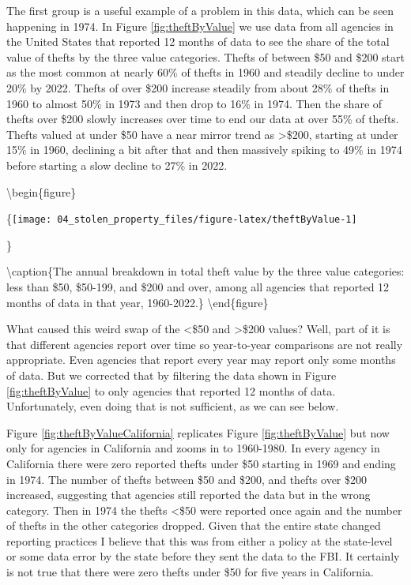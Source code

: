 \documentclass[
]{krantz}
\begin{document}
The first group is a useful example of a problem in this
data, which can be seen happening in 1974. In Figure
\ref{fig:theftByValue} we use data from all agencies in the
United States that reported 12 months of data to see the
share of the total value of thefts by the three value
categories. Thefts of between \$50 and \$200 start as the
most common at nearly 60\% of thefts in 1960 and steadily
decline to under 20\% by 2022. Thefts of over \$200 increase
steadily from about 28\% of thefts in 1960 to almost 50\% in
1973 and then drop to 16\% in 1974. Then the share of thefts
over \$200 slowly increases over time to end our data at
over 55\% of thefts. Thefts valued at under \$50 have a near
mirror trend as \textgreater\$200, starting at under 15\% in
1960, declining a bit after that and then massively spiking
to 49\% in 1974 before starting a slow decline to 27\% in
2022.

\textbackslash begin\{figure\}

\{\centering \texttt{[image: 04\_stolen\_property\_files/figure-latex/theftByValue-1]}

\}

\textbackslash caption\{The annual breakdown in total theft
value by the three value categories: less than \$50,
\$50-199, and \$200 and over, among all agencies that
reported 12 months of data in that year,
1960-2022.\}\label{fig:theftByValue}
\textbackslash end\{figure\}

What caused this weird swap of the \textless\$50 and
\textgreater\$200 values? Well, part of it is that different
agencies report over time so year-to-year comparisons are
not really appropriate. Even agencies that report every year
may report only some months of data. But we corrected that
by filtering the data shown in Figure \ref{fig:theftByValue}
to only agencies that reported 12 months of data.
Unfortunately, even doing that is not sufficient, as we can
see below.

Figure \ref{fig:theftByValueCalifornia} replicates Figure
\ref{fig:theftByValue} but now only for agencies in
California and zooms in to 1960-1980. In every agency in
California there were zero reported thefts under \$50
starting in 1969 and ending in 1974. The number of thefts
between \$50 and \$200, and thefts over \$200 increased,
suggesting that agencies still reported the data but in the
wrong category. Then in 1974 the thefts \textless\$50 were
reported once again and the number of thefts in the other
categories dropped. Given that the entire state changed
reporting practices I believe that this was from either a
policy at the state-level or some data error by the state
before they sent the data to the FBI. It certainly is not
true that there were zero thefts under \$50 for five years
in California.
\end{document}
